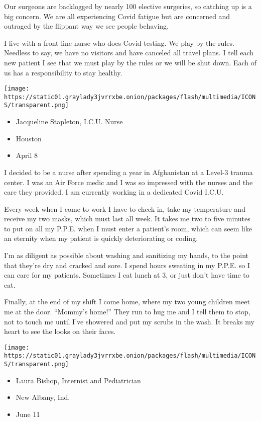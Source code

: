 Our surgeons are backlogged by nearly 100 elective surgeries, so
catching up is a big concern. We are all experiencing Covid fatigue but
are concerned and outraged by the flippant way we see people behaving.

I live with a front-line nurse who does Covid testing. We play by the
rules. Needless to say, we have no visitors and have canceled all travel
plans. I tell each new patient I see that we must play by the rules or
we will be shut down. Each of us has a responsibility to stay healthy.

\texttt{[image: https://static01.graylady3jvrrxbe.onion/packages/flash/multimedia/ICONS/transparent.png]}

\begin{itemize}
\tightlist
\item
  Jacqueline Stapleton, I.C.U. Nurse
\item
  Houston
\item
  April 8
\end{itemize}

I decided to be a nurse after spending a year in Afghanistan at a
Level-3 trauma center. I was an Air Force medic and I was so impressed
with the nurses and the care they provided. I am currently working in a
dedicated Covid I.C.U.

Every week when I come to work I have to check in, take my temperature
and receive my two masks, which must last all week. It takes me two to
five minutes to put on all my P.P.E. when I must enter a patient's room,
which can seem like an eternity when my patient is quickly deteriorating
or coding.

I'm as diligent as possible about washing and sanitizing my hands, to
the point that they're dry and cracked and sore. I spend hours sweating
in my P.P.E. so I can care for my patients. Sometimes I eat lunch at 3,
or just don't have time to eat.

Finally, at the end of my shift I come home, where my two young children
meet me at the door. ``Mommy's home!'' They run to hug me and I tell
them to stop, not to touch me until I've showered and put my scrubs in
the wash. It breaks my heart to see the looks on their faces.

\texttt{[image: https://static01.graylady3jvrrxbe.onion/packages/flash/multimedia/ICONS/transparent.png]}

\begin{itemize}
\tightlist
\item
  Laura Bishop, Internist and Pediatrician
\item
  New Albany, Ind.
\item
  June 11
\end{itemize}

